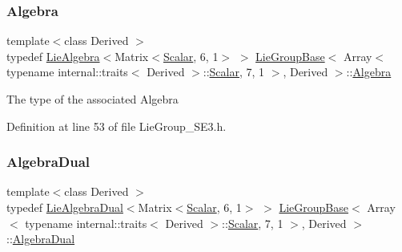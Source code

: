 \subsubsection{\texorpdfstring{Algebra}{Algebra}}
{\footnotesize\ttfamily template$<$class Derived $>$ \\
typedef \hyperlink{class_lie_algebra}{Lie\+Algebra}$<$Matrix$<$\hyperlink{class_lie_group_base_3_01_array_3_01typename_01internal_1_1traits_3_01_derived_01_4_1_1_scalar_0d6d4b5459662fc32c7117aee50362fb1_a831695c575380c9a1df32eff9fc4a8c6}{Scalar}, 6, 1$>$ $>$ \hyperlink{class_lie_group_base}{Lie\+Group\+Base}$<$ Array$<$ typename internal\+::traits$<$ Derived $>$\+::\hyperlink{class_lie_group_base_3_01_array_3_01typename_01internal_1_1traits_3_01_derived_01_4_1_1_scalar_0d6d4b5459662fc32c7117aee50362fb1_a831695c575380c9a1df32eff9fc4a8c6}{Scalar}, 7, 1 $>$, Derived $>$\+::\hyperlink{class_lie_group_base_3_01_array_3_01typename_01internal_1_1traits_3_01_derived_01_4_1_1_scalar_0d6d4b5459662fc32c7117aee50362fb1_a070c90abe2058ce2ab6a2f5ed271f6a0}{Algebra}}

The type of the associated Algebra 

Definition at line 53 of file Lie\+Group\+\_\+\+S\+E3.\+h.

\hypertarget{class_lie_group_base_3_01_array_3_01typename_01internal_1_1traits_3_01_derived_01_4_1_1_scalar_0d6d4b5459662fc32c7117aee50362fb1_a2dd3f6a200785678c87f78f08aa24288}{}\label{class_lie_group_base_3_01_array_3_01typename_01internal_1_1traits_3_01_derived_01_4_1_1_scalar_0d6d4b5459662fc32c7117aee50362fb1_a2dd3f6a200785678c87f78f08aa24288} 
\subsubsection{\texorpdfstring{Algebra\+Dual}{AlgebraDual}}
{\footnotesize\ttfamily template$<$class Derived $>$ \\
typedef \hyperlink{class_lie_algebra_dual}{Lie\+Algebra\+Dual}$<$Matrix$<$\hyperlink{class_lie_group_base_3_01_array_3_01typename_01internal_1_1traits_3_01_derived_01_4_1_1_scalar_0d6d4b5459662fc32c7117aee50362fb1_a831695c575380c9a1df32eff9fc4a8c6}{Scalar}, 6, 1$>$ $>$ \hyperlink{class_lie_group_base}{Lie\+Group\+Base}$<$ Array$<$ typename internal\+::traits$<$ Derived $>$\+::\hyperlink{class_lie_group_base_3_01_array_3_01typename_01internal_1_1traits_3_01_derived_01_4_1_1_scalar_0d6d4b5459662fc32c7117aee50362fb1_a831695c575380c9a1df32eff9fc4a8c6}{Scalar}, 7, 1 $>$, Derived $>$\+::\hyperlink{class_lie_group_base_3_01_array_3_01typename_01internal_1_1traits_3_01_derived_01_4_1_1_scalar_0d6d4b5459662fc32c7117aee50362fb1_a2dd3f6a200785678c87f78f08aa24288}{Algebra\+Dual}}

